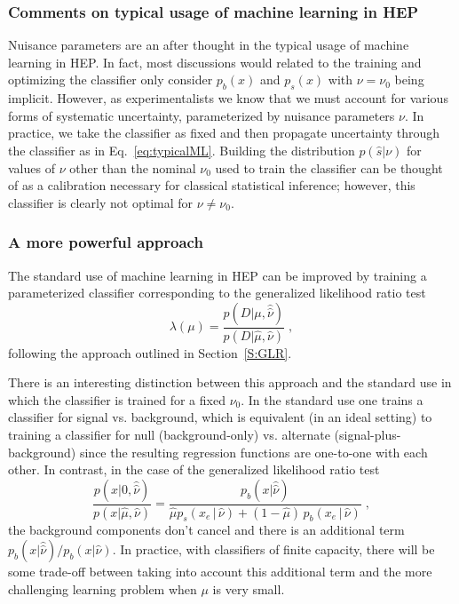 \documentclass[12pt]{article}
\numberwithin{equation}{section}
\theoremstyle{plain}
\begin{document}
\subsubsection{Comments on typical usage of machine learning in HEP}

Nuisance parameters are an after thought in the typical usage of machine
learning in HEP. In fact, most discussions would related to the training and
optimizing the classifier only consider $p_b(x)$ and $p_s(x)$ with $\nu=\nu_0$
being implicit. However, as experimentalists we know that we must account for
various forms of systematic uncertainty, parameterized by nuisance parameters
$\nu$. In practice, we take the classifier as fixed and then propagate
uncertainty through the classifier as in Eq.~\ref{eq:typicalML}. Building the
distribution $p(\hat s|\nu)$ for values of $\nu$ other than the nominal $\nu_0$
used to train the classifier can be thought of as a calibration necessary for
classical statistical inference; however, this classifier is clearly not optimal
for $\nu \ne \nu_0$.

\subsubsection{A more powerful  approach}

The standard use of machine learning in HEP can be improved by training a
parameterized classifier corresponding to the generalized likelihood ratio test
\begin{equation}
\lambda(\mu) = \frac{p(D|\mu, \hat{\hat{\nu}})}{p(D|\hat \mu, {\hat{\nu}})} \;,
\end{equation}
following the approach outlined in Section~\ref{S:GLR}.

There is an interesting distinction between this approach and the standard use
in which the classifier is trained for a fixed $\nu_0$. In the standard use one
trains a classifier for signal vs. background, which is equivalent (in an ideal
setting) to training a classifier for  null (background-only) vs. alternate
(signal-plus-background) since the resulting regression functions are one-to-one
with each other. In contrast, in the case of the generalized likelihood ratio
test
\begin{equation}\label{eq:hep_improved}
 \frac{p(x| 0, \hat{\hat{ \nu}})}{p(x|\hat \mu, \hat\nu)} =  \frac{p_b(x| \hat{\hat{ \nu}})}{ \hat \mu p_s( x_e \, |\,  \hat\nu)  + (1- \hat \mu )\, p_b( x_e \,|\, \hat \nu)} \; ,
\end{equation}
the background components don't cancel and there is an additional term $p_b(x|
\hat{\hat{ \nu}})/p_b(x| {\hat{ \nu}})$. In practice, with classifiers of finite
capacity, there will be some trade-off between taking into account this
additional term and the more challenging learning problem when $\mu$ is very
small.
\end{document}
